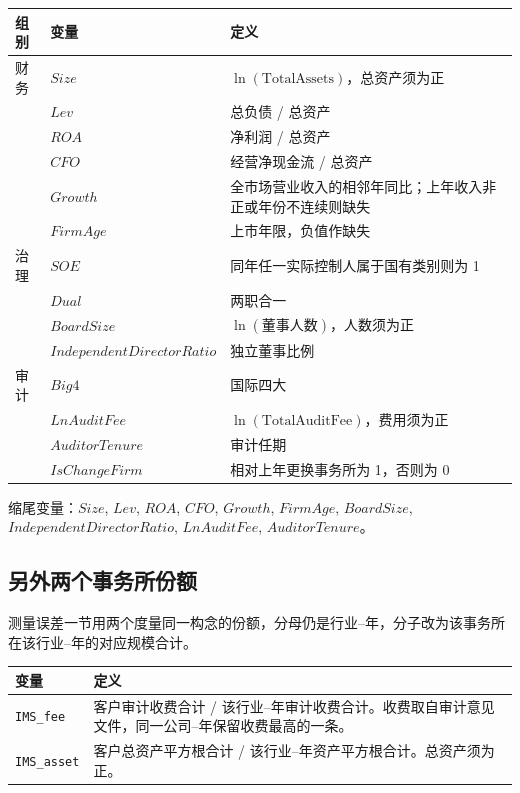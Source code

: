 \documentclass[11pt]{article}
\begin{document}
\begin{center}
\begin{threeparttable}
\caption{基准控制变量}
\begin{tabular}{llp{9.2cm}}
\toprule
组别 & 变量 & 定义 \\
\midrule
财务 & \(Size\) & \(\ln(\text{TotalAssets})\)，总资产须为正 \\
 & \(Lev\) & 总负债 / 总资产 \\
 & \(ROA\) & 净利润 / 总资产 \\
 & \(CFO\) & 经营净现金流 / 总资产 \\
 & \(Growth\) & 全市场营业收入的相邻年同比；上年收入非正或年份不连续则缺失 \\
 & \(FirmAge\) & 上市年限，负值作缺失 \\
治理 & \(SOE\) & 同年任一实际控制人属于国有类别则为 1 \\
 & \(Dual\) & 两职合一 \\
 & \(BoardSize\) & \(\ln(\text{董事人数})\)，人数须为正 \\
 & \(IndependentDirectorRatio\) & 独立董事比例 \\
审计 & \(Big4\) & 国际四大 \\
 & \(LnAuditFee\) & \(\ln(\text{TotalAuditFee})\)，费用须为正 \\
 & \(AuditorTenure\) & 审计任期 \\
 & \(IsChangeFirm\) & 相对上年更换事务所为 1，否则为 0 \\
\bottomrule
\end{tabular}
\begin{tablenotes}\footnotesize
\item 缩尾变量：\(Size\), \(Lev\), \(ROA\), \(CFO\), \(Growth\), \(FirmAge\), \(BoardSize\), \(IndependentDirectorRatio\), \(LnAuditFee\), \(AuditorTenure\)。
\end{tablenotes}
\end{threeparttable}
\end{center}

\subsection{另外两个事务所份额}

测量误差一节用两个度量同一构念的份额，分母仍是行业--年，分子改为该事务所在该行业--年的对应规模合计。

\begin{center}
\begin{threeparttable}
\caption{替代专长度量}
\begin{tabular}{lp{10.5cm}}
\toprule
变量 & 定义 \\
\midrule
\texttt{IMS\_fee} & 客户审计收费合计 / 该行业--年审计收费合计。收费取自审计意见文件，同一公司--年保留收费最高的一条。 \\
\texttt{IMS\_asset} & 客户总资产平方根合计 / 该行业--年资产平方根合计。总资产须为正。 \\
\bottomrule
\end{tabular}
\end{threeparttable}
\end{center}
\end{document}
